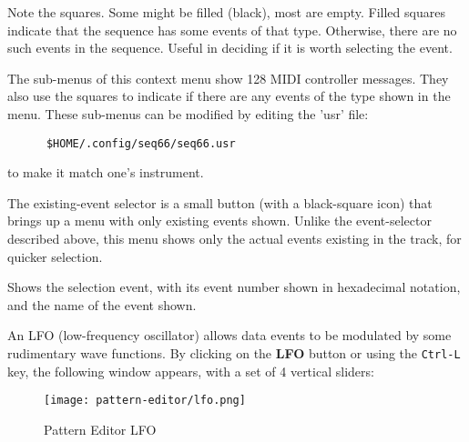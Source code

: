\begin{itemize}
   Note the squares.  Some might be filled (black), most are empty.
   Filled squares indicate that the sequence has some events of that type.
   Otherwise, there are no such events in the sequence.
   Useful in deciding if it is worth selecting the event.

   The sub-menus of this context menu show 128 MIDI controller messages.
   They also use the squares to
   indicate if there are any events of the type shown in the menu.
   These sub-menus can be modified by editing the 'usr' file:
   
   \begin{verbatim}
      $HOME/.config/seq66/seq66.usr
   \end{verbatim}

   to make it match one's instrument.

   The existing-event selector is a small button (with a black-square icon)
   that brings up a menu with only existing events shown.
   Unlike the event-selector described above, this menu
   shows only the actual events existing in the track, for quicker selection.

   Shows the selection event, with its event number shown in hexadecimal
   notation, and the name of the event shown.

   An LFO (low-frequency oscillator) allows data events
   to be modulated by some rudimentary wave functions.
   By clicking on the \textbf{LFO} button or using the \texttt{Ctrl-L} key,
   the following window appears, with a set of 4 vertical sliders:

\begin{figure}[H]
   \centering 
  \texttt{[image: pattern-editor/lfo.png]}
   \caption{Pattern Editor LFO}
   \label{fig:pattern_editor_bottom_lfo}
\end{figure}


\end{itemize}
